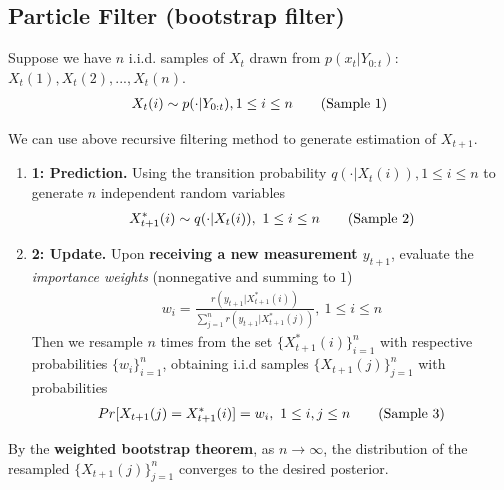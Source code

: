 \documentclass[11pt]{elegantbook}
\begin{document}
\subsection{Particle Filter (bootstrap filter)}
Suppose we have $n$ i.i.d. samples of $X_t$ drawn from $p(x_t|Y_{0:t})$: $X_t(1),X_t(2),...,X_t(n)$.
\begin{equation}
    \begin{aligned}
        X_{t}(i)\sim p(\cdot|Y_{0:t}),1\leq i\leq n
    \end{aligned}
    \tag{\text{Sample 1}}
\end{equation}

We can use above recursive filtering method to generate estimation of $X_{t+1}$.
\begin{enumerate}
    \item \textbf{ 1: Prediction.} Using the transition probability $q(\cdot|X_t(i)),1\leq i\leq n$ to generate $n$ independent random variables
    \begin{equation}
        \begin{aligned}
            X^*_{t+1}(i)\sim q(\cdot|X_t(i)),\ 1\leq i\leq n
        \end{aligned}
        \tag{\text{Sample 2}}
    \end{equation}
    \item \textbf{ 2: Update.} Upon \textbf{receiving a new measurement $y_{t+1}$}, evaluate the \textit{importance weights} (nonnegative and summing to $1$)
    \begin{equation}
        \begin{aligned}
            w_i=\frac{r(y_{t+1}|X_{t+1}^*(i))}{\sum_{j=1}^n r(y_{t+1}|X_{t+1}^*(j))},\ 1\leq i\leq n
        \end{aligned}
        \nonumber
    \end{equation}
    Then we resample $n$ times from the set $\{X_{t+1}^*(i)\}_{i=1}^n$ with respective probabilities $\{w_i\}_{i=1}^n$, obtaining i.i.d samples $\{X_{t+1}(j)\}_{j=1}^n$ with probabilities
    \begin{equation}
        \begin{aligned}
            Pr[X_{t+1}(j)=X_{t+1}^*(i)]=w_i,\ 1\leq i,j\leq n
        \end{aligned}
        \tag{\text{Sample 3}}
    \end{equation}
\end{enumerate}
By the \textbf{weighted bootstrap theorem}, as $n \rightarrow \infty$, the distribution of the
resampled $\{X_{t+1}(j)\}_{j=1}^n$ converges to the desired posterior.
\end{document}
